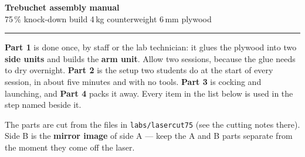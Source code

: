 \documentclass[11pt,a4paper]{article}
\begin{document}
\small

{\LARGE\bfseries\color{Ink} Trebuchet assembly manual}\\[2pt]
{\large 75\,\% knock-down build \textbullet{} 4\,kg counterweight \textbullet{} 6\,mm plywood}\\[2pt]
{\color{RuleGrey}\rule{\linewidth}{1.2pt}}

\textbf{Part 1} is done once, by staff or the lab technician: it glues the plywood into two \textbf{side units} and builds the \textbf{arm unit}. Allow two sessions, because the glue needs to dry overnight. \textbf{Part 2} is the setup two students do at the start of every session, in about five minutes and with no tools. \textbf{Part 3} is cocking and launching, and \textbf{Part 4} packs it away. Every item in the list below is used in the step named beside it.

The parts are cut from the files in \texttt{labs/lasercut75} (see the cutting notes there). Side B is the \textbf{mirror image} of side A --- keep the A and B parts separate from the moment they come off the laser.
\end{document}
